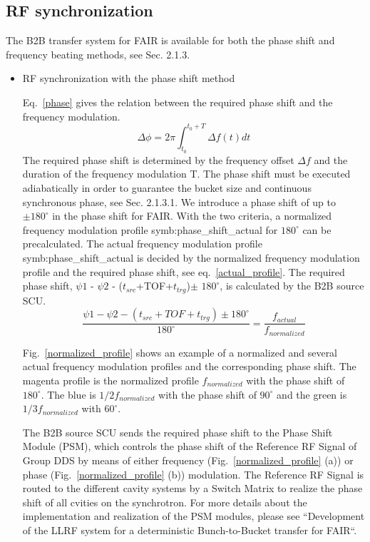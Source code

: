 \subsection{RF synchronization}
The B2B transfer system for FAIR is available for both the phase shift and frequency beating methods, see Sec. 2.1.3.
\begin{itemize}
\item RF synchronization with the phase shift method

Eq.~\ref{phase} gives the relation between the required phase shift and the frequency modulation. 
\begin{equation}
\Delta \phi= 2\pi \int_{t_0}^{t_0+T} \Delta f(t)dt \label{phase}
\end{equation}
The required phase shift is determined by the frequency offset $\Delta f$ and the duration of the frequency modulation T. The phase shift must be executed adiabatically in order to guarantee the bucket size and continuous synchronous phase, see Sec. 2.1.3.1. We introduce a phase shift of up to $\pm 180^\circ$ in the phase shift for FAIR. With the two criteria, a normalized frequency modulation profile \gls{symb:phase_shift_actual} for $180^\circ$ can be precalculated. The actual frequency modulation profile \gls{symb:phase_shift_actual} is decided by the normalized frequency modulation profile and the required phase shift, see eq.~\ref{actual_profile}. The required phase shift, $\psi1$ - $\psi2$ - ($t_{src}$+TOF+$t_{trg}$)$\pm$ $180^\circ$, is calculated by the B2B source SCU.
\begin{equation}
\frac{\psi1 - \psi2 - (t_{src}+TOF+t_{trg})\pm 180^\circ}{180^\circ}= \frac{f_{actual}}{f_{normalized}} \label{actual_profile}
\end{equation}

Fig.~\ref{normalized_profile} shows an example of a normalized and several actual frequency modulation profiles and the corresponding phase shift. The magenta profile is the normalized profile $f_{normalized}$ with the phase shift of $180^\circ$. The blue is $1/2f_{normalized}$ with the phase shift of $90^\circ$ and the green is $1/3f_{normalized}$ with $60^\circ$. 

The B2B source SCU sends the required phase shift to the Phase Shift Module (\gls{PSM}), which controls the phase shift of the Reference RF Signal of Group DDS by means of either frequency (Fig.~\ref{normalized_profile} (a)) or phase (Fig.~\ref{normalized_profile} (b)) modulation. The Reference RF Signal is routed to the different cavity systems by a Switch Matrix to realize the phase shift of all cvities on the synchrotron. For more details about the implementation and realization of the PSM modules, please see ``Development of the LLRF system for a deterministic Bunch-to-Bucket transfer for FAIR``.
                       

\end{itemize}

